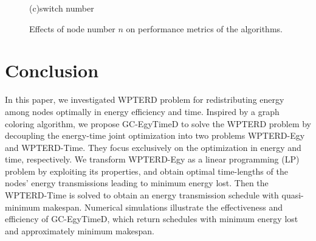 \documentclass[12pt,journal,onecolumn,draftcls]{IEEEtran}
\begin{document}
\begin{figure}[!htbp]
{\hspace{0.01\textwidth}%
\begin{minipage}[c]{0.32\textwidth}
\parbox{\linewidth}{\centering\small{(c)switch number}}
\end{minipage}
}
\caption{Effects of node number $n$ on performance metrics of the algorithms.}
\label{fig_sim_n}
\end{figure}


\section{Conclusion}
\label{sec_conclusion}
In this paper, we investigated WPTERD problem for redistributing energy among nodes optimally in energy efficiency and time. Inspired by a graph coloring algorithm, we propose GC-EgyTimeD to solve the WPTERD problem by decoupling the energy-time joint optimization into two problems WPTERD-Egy and WPTERD-Time. They focus exclusively on the optimization in energy and time, respectively. We transform WPTERD-Egy as a linear programming (LP) problem by exploiting its properties, and obtain optimal time-lengths of the nodes' energy transmissions leading to minimum energy lost. Then the WPTERD-Time is solved to obtain an energy transmission schedule with quasi-minimum makespan. Numerical simulations illustrate the effectiveness and efficiency of GC-EgyTimeD, which return schedules with minimum energy lost and approximately minimum makespan.
\end{document}
